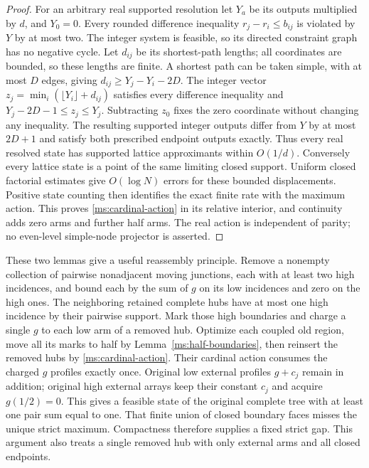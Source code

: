 \begin{proof}
For an arbitrary real supported resolution let $Y_a$ be its
outputs multiplied by $d$, and $Y_0=0$. Every rounded difference
inequality $r_j-r_i\le b_{ij}$ is violated by $Y$ by at most two.
The integer system is feasible, so its directed constraint graph
has no negative cycle. Let $d_{ij}$ be its shortest-path lengths;
all coordinates are bounded, so these lengths are finite. A
shortest path can be taken simple, with at most $D$ edges, giving
$d_{ij}\ge Y_j-Y_i-2D$. The integer vector
$z_j=\min_i(\lfloor Y_i\rfloor+d_{ij})$ satisfies every difference
inequality and $Y_j-2D-1\le z_j\le Y_j$. Subtracting $z_0$ fixes
the zero coordinate without changing any inequality. The resulting
supported integer outputs differ from $Y$ by at most $2D+1$ and
satisfy both prescribed endpoint outputs exactly. Thus every real
resolved state has supported lattice approximants within $O(1/d)$.
Conversely every lattice state is a point of the same limiting
closed support. Uniform closed factorial estimates give $O(\log N)$
errors for these bounded displacements. Positive state counting
then identifies the exact finite rate with the maximum action.
This proves
\eqref{ms:cardinal-action} in its relative interior, and continuity
adds zero arms and further half arms. The real action is independent
of parity; no even-level simple-node projector is asserted.
\end{proof}

These two lemmas give a useful reassembly principle. Remove a
nonempty collection of pairwise nonadjacent moving junctions, each
with at least two high incidences, and bound each by the sum of
$g$ on its low incidences and zero on the high ones. The neighboring
retained complete hubs have at most one high incidence by their
pairwise support. Mark those high boundaries and charge a single
$g$ to each low arm of a removed hub. Optimize each coupled old
region, move all its marks to half by Lemma~\ref{ms:half-boundaries},
then reinsert the removed hubs by \eqref{ms:cardinal-action}.
Their cardinal action consumes the charged $g$ profiles exactly
once. Original low external profiles $g+c_j$ remain in addition;
original high external arrays keep their constant $c_j$ and acquire
$g(1/2)=0$. This gives a feasible state of the original complete
tree with at least one pair sum equal to one. That finite union of
closed boundary faces misses the unique strict maximum. Compactness
therefore supplies a fixed strict gap. This argument also treats a
single removed hub with only external arms and all closed endpoints.
